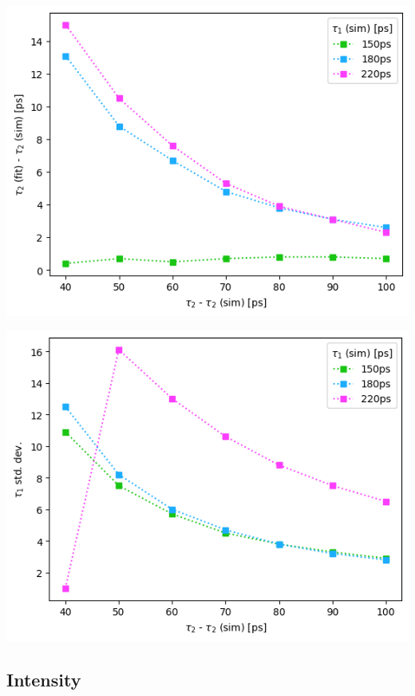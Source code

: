 \begin{minipage}{.5\linewidth}
    \centering
    \includegraphics[width=\linewidth]{Batch 3/regular IRF/t2-diff 8020.png}
    \label{fig:comp-t2-8020}
\end{minipage}
\begin{minipage}{.5\linewidth}
    \centering
    \includegraphics[width=\linewidth]{Batch 3/regular IRF/t2-err 8020.png}
    \label{fig:comp-t2err-8020}
\end{minipage}

\vfill
\subsection*{\LARGE\centering Intensity}

